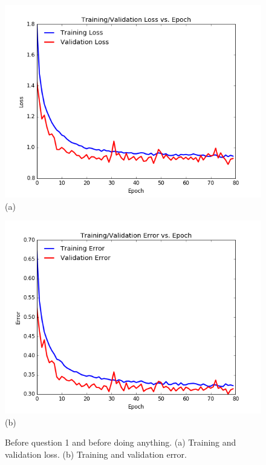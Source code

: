 \documentclass[paper=a4, fontsize=11pt]{scrartcl}
\begin{document}
\begin{figure}
\centering
\centering
 \begin{minipage}{.5\columnwidth}
\centering
  	\includegraphics[width=1\linewidth]{baseline_loss.png}
  	\footnotesize{(a)}
 \end{minipage}\hfill%
\centering
 \begin{minipage}{.5\columnwidth}
\centering
  	\includegraphics[width=1\columnwidth]{baseline_error.png}
  	\footnotesize{(b)}
 \end{minipage}\hfill%
\caption{Before question 1 and before doing anything. (a) Training and validation loss. (b) Training and validation error.}
\label{fig:baseline}
\end{figure}
\end{document}
